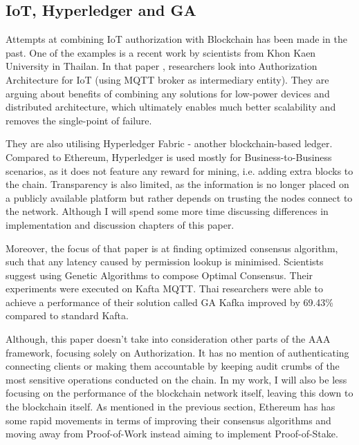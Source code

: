 \subsection{IoT, Hyperledger and GA}

Attempts at combining IoT authorization with Blockchain has been made in the past. One of the examples is a recent work by scientists from Khon Kaen University in Thailan. In that paper \cite{klaokliang2018novel}, researchers look into Authorization Architecture for IoT (using MQTT broker as intermediary entity). They are arguing about benefits of combining any solutions for low-power devices and distributed architecture, which ultimately enables much better scalability and removes the single-point of failure.

They are also utilising Hyperledger Fabric - another blockchain-based ledger. Compared to Ethereum, Hyperledger \cite{cachin2016architecture} is used mostly for Business-to-Business scenarios, as it does not feature any reward for mining, i.e. adding extra blocks to the chain. Transparency is also limited, as the information is no longer placed on a publicly available platform but rather depends on trusting the nodes connect to the network. Although I will spend some more time discussing differences in implementation and discussion chapters of this paper.

Moreover, the focus of that paper is at finding optimized consensus algorithm, such that any latency caused by permission lookup is minimised. Scientists suggest using Genetic Algorithms to compose Optimal Consensus. Their experiments were executed on Kafta MQTT\cite{waehner_2019}. Thai researchers were able to achieve a performance of their solution called GA Kafka improved by 69.43\% compared to standard Kafta.

Although, this paper doesn't take into consideration other parts of the AAA framework, focusing solely on Authorization. It has no mention of authenticating connecting clients or making them accountable by keeping audit crumbs of the most sensitive operations conducted on the chain. In my work, I will also be less focusing on the performance of the blockchain network itself, leaving this down to the blockchain itself. As mentioned in the previous section, Ethereum has has some rapid movements in terms of improving their consensus algorithms and moving away from Proof-of-Work instead aiming to implement Proof-of-Stake.
